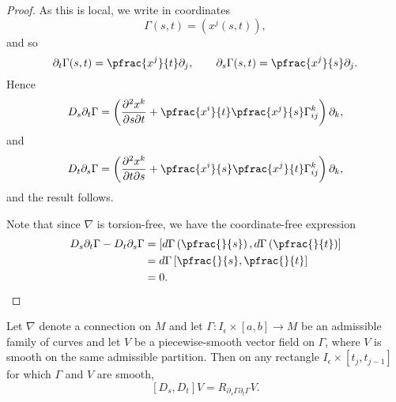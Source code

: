 \begin{proof}
As this is local, we write in coordinates
$$\Gamma(s,t)=(x^j(s,t)),$$
and so
$$\partial_t\Gamma(s,t)=\pfrac{x^j}{t}\partial_j,\qquad \partial_s\Gamma(s,t)=\pfrac{x^j}{s}\partial_j.$$
Hence
$$D_s\partial_t\Gamma=\left(\frac{\partial^2x^k}{\partial s\partial t}+\pfrac{x^i}{t}\pfrac{x^j}{s}\Gamma_{ij}^k\right)\partial_k,$$
and
$$D_t\partial_s\Gamma=\left(\frac{\partial^2x^k}{\partial t\partial s}+\pfrac{x^i}{s}\pfrac{x^j}{t}\Gamma_{ij}^k\right)\partial_k,$$
and the result follows.

Note that since $\nabla$ is torsion-free, we have the coordinate-free expression
\begin{align*}
	D_s\partial_t\Gamma-D_t\partial_s\Gamma&=\left[d\Gamma\left(\pfrac{}{s}\right),d\Gamma\left(\pfrac{}{t}\right)\right]\\
	&=d\Gamma\left[\pfrac{}{s},\pfrac{}{t}\right]\\
	&=0.
\end{align*}

\end{proof}

\begin{lem}\label{thm:curvatureLemma}
    Let $\nabla$ denote a connection on $M$ and let $\Gamma:I_\epsilon\times[a,b]\to M$ be an admissible family of curves and let $V$ be a piecewise-smooth vector field on $\Gamma$, where $V$ is smooth on the same admissible partition.  Then on any rectangle $I_\epsilon\times[t_j,t_{j-1}]$ for which $\Gamma$ and $V$ are smooth,
    $$[D_s,D_t]V=R_{\partial_s\Gamma\partial_t\Gamma}V.$$
\end{lem}

